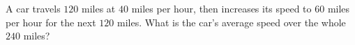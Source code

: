 A car travels $120$ miles at $40$ miles per hour, then increases its speed to $60$ miles per hour for the next $120$ miles. What is the car's average speed over the whole $240$ miles?
